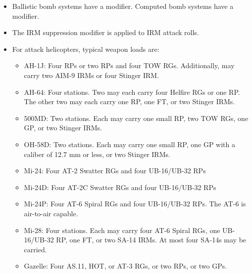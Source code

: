 \begin{landscape}
\begin{fullwidthtable}
\begin{tabularx}{\linewidth}{Lccccclllrcccccccccccc}
\bottomrule
\end{tabularx}
\begin{tablenote}{\linewidth}
\begin{itemize}



    \item Ballistic bomb systems have a  modifier. Computed bomb systems have a  modifier.

    \item The IRM suppression modifier is applied to IRM attack rolls.
    
    \item For attack helicopters, typical weapon loads are:
    \begin{itemize}
        \item AH-1J: Four RPs or two RPs and four TOW RGs. Additionally, may carry two AIM-9 IRMs or four Stinger IRM.
        \item AH-64: Four stations. Two may each carry four Helfire RGs or one RP. The other two may each carry one RP, one FT, or two Stinger IRMs.
        \item 500MD: Two stations. Each may carry one small RP, two TOW RGs, one GP, or two Stinger IRMs.
        \item OH-58D: Two stations. Each may carry one small RP, one GP with a caliber of 12.7 mm or less, or two Stinger IRMs.
        \item Mi-24: Four AT-2 Swatter RGs and four UB-16/UB-32 RPs
        \item Mi-24D: Four AT-2C Swatter RGs and four UB-16/UB-32 RPs
        \item Mi-24P: Four AT-6 Spiral RGs and four UB-16/UB-32 RPs. The AT-6 is air-to-air capable.
        \item Mi-28: Four stations. Each may carry four AT-6 Spiral RGs, one UB-16/UB-32 RP, one FT, or two SA-14 IRMs. At most four SA-14s may be carried.
        \item Gazelle: Four AS.11, HOT, or AT-3 RGs, or two RPs, or two GPs.
    \end{itemize}
\end{itemize}
\end{tablenote}

\end{fullwidthtable}

\end{landscape}
